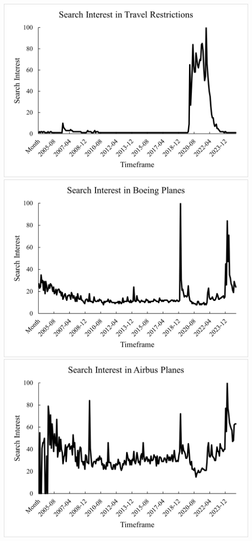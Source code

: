 \documentclass[12pt]{report}
\begin{document}
\includegraphics[scale=.6]{Picture1}
\includegraphics[scale=.6]{Picture2}\\
\includegraphics[scale=.6]{Picture3}
\end{document}
